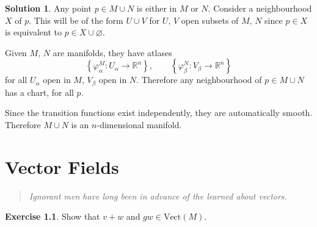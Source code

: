 \documentclass[11pt, a4paper]{report}
\theoremstyle{definition}
\newtheorem{ex}{Exercise}[part]
\newtheorem{sol}{Solution}[part]
\newenvironment{epigraph}
    {\begin{quote}\small\itshape} %
    {\end{quote}\ignorespacesafterend\vspace{\parskip}}
\begin{document}
\begin{sol}

Any point $p \in M \cup N$ is either in $M$ or $N$. Consider a neighbourhood $X$ of $p$. This will be of the form $U \cup V$ for $U$, $V$ open subsets of $M$, $N$ since $p \in X$ is equivalent to $p \in X \cup \varnothing$.

Given $M$, $N$ are manifolds, they have atlases
\[
    \left\{\varphi^M_\alpha: U_\alpha \to \mathbb{R}^n \right\}, \qquad
    \left\{\varphi^N_\beta: V_\beta \to \mathbb{R}^n \right\}
\]
for all $U_\alpha$ open in $M$, $V_\beta$ open in $N$. Therefore any neighbourhood of $p \in M \cup N$ has a chart, for all $p$.

Since the transition functions exist independently, they are automatically smooth. Therefore $M \cup N$ is an $n$-dimensional manifold.

\end{sol}

\chapter{Vector Fields}\label{ch:vectorfields}

\begin{epigraph}
    Ignorant men have long been in advance of the learned about vectors.
\end{epigraph}

\begin{ex}

Show that $v + w$ and $gw \in \text{Vect}(M)$.

\end{ex}
\end{document}
